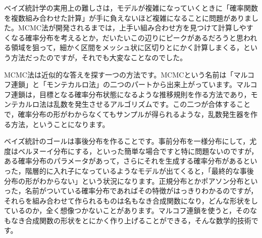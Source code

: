 \documentclass{ltjsarticle}
\begin{document}
ベイズ統計学の実用上の難しさは，モデルが複雑になっていくときに「確率関数を複数組み合わせた計算」が手に負えないほど複雑になることに問題がありました。MCMC法が開発されるまでは，上手い組み合わせ方を見つけて計算しやすくなる確率分布を考えるとか，だいたいこの辺りにピークがあるだろうと思われる領域を狙って，細かく区間をメッシュ状に区切りとにかく計算しまくる，という方法だったのですが，それでも大変なことなのでした。

MCMC法は近似的な答えを探す一つの方法です。MCMCという名前は「マルコフ連鎖」と「モンテカルロ法」の二つのパートから出来上がっています。マルコフ連鎖は，目標となる確率分布状態になるような推移規則を作る方法であり，モンテカルロ法は乱数を発生させるアルゴリズムです。この二つが合体することで，確率分布の形がわからなくてもサンプルが得られるような，乱数発生器を作る方法，ということになります。

ベイズ統計のゴールは事後分布を作ることです。事前分布を一様分布にして，尤度はベルヌーイ分布にする，といった簡単な場合ですと特に問題ないのですが，ある確率分布のパラメータがあって，さらにそれを生成する確率分布があるといった，階層的に入れ子になっているようなモデルが出てくると，「最終的な事後分布の形がわからない」という状況になります。正規分布とかポアソン分布といった，名前がついている確率分布であればその特徴がはっきりわかるのですが，それらを組み合わせて作られるものは名もなき合成関数になり，どんな形状をしているのか，全く想像つかないことがあります。マルコフ連鎖を使うと，そのなもなき合成関数の形状をとにかく作り上げることができる，そんな数学的技術です。
\end{document}
